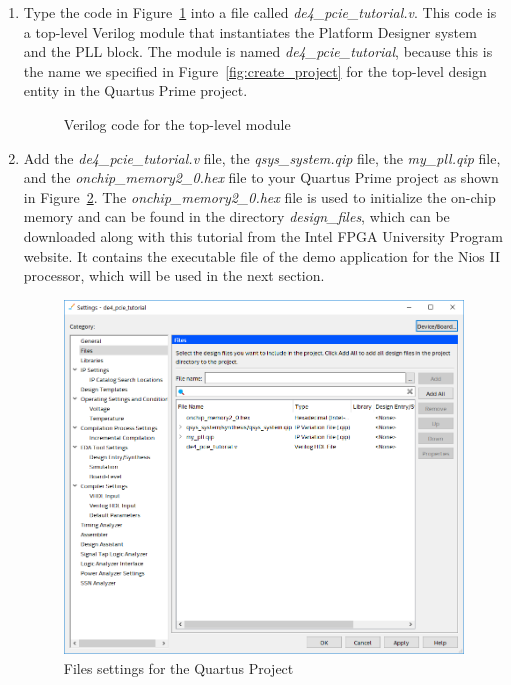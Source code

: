 \documentclass[11pt, twoside, pdftex]{article}
\begin{document}
\begin{enumerate}
	\item Type the code in Figure~\ref{fig:wrapper_hdl} into a file called {\it de4\_pcie\_tutorial.v}. This code is a top-level Verilog module that instantiates the Platform Designer system and the PLL block. The module is named {\it de4\_pcie\_tutorial}, because this is the name we specified in Figure~\ref{fig:create_project} for the top-level design entity in the Quartus Prime project. 
	
\begin{figure}[H]%
	
	\caption{Verilog code for the top-level module}%
	\label{fig:wrapper_hdl}%
\end{figure}	
	
	\item Add the {\it de4\_pcie\_tutorial.v} file, the {\it qsys\_system.qip} file, the {\it my\_pll.qip} file, and the {\it onchip\_memory2\_0.hex} file to your Quartus Prime project as shown in Figure~\ref{fig:file_settings}. The {\it onchip\_memory2\_0.hex} file is used to initialize the on-chip memory and can be found in the directory {\it design\_files}, which can be downloaded along with this tutorial from the Intel FPGA University Program website. It contains the executable file of the demo application for the Nios II processor, which will be used in the next section.

\begin{figure}%
	\centering
		\includegraphics[scale=0.65]{figures/file_settings.png}%
	\caption{Files settings for the Quartus Project}%
	\label{fig:file_settings}%
\end{figure}


\end{enumerate}
\end{document}
